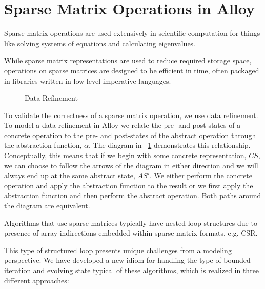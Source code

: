 \section{Sparse Matrix Operations in Alloy}
\label{sec:ops}

Sparse matrix operations are used extensively in scientific computation for things like solving systems of equations and calculating eigenvalues. 

While sparse matrix representations are used to reduce required storage space, operations on sparse matrices are designed to be efficient in time, often packaged in libraries written in low-level imperative languages.

\begin{figure}
\begin{center}
\end{center}
\caption{Data Refinement}
\label{fig:procref}
\end{figure}

To validate the correctness of a sparse matrix operation, we use data refinement.  To model a data refinement in Alloy we relate the pre- and post-states of a concrete operation to the pre- and post-states of the abstract operation through the abstraction function, $\alpha$.  The diagram in \figurename~\ref{fig:procref} demonstrates this relationship.  Conceptually, this means that if we begin with some concrete representation, $CS$, we can choose to follow the arrows of the diagram in either direction and we will always end up at the same abstract state, $AS'$.  We either perform the concrete operation and apply the abstraction function to the result or we first apply the abstraction function and then perform the abstract operation.  Both paths around the diagram are equivalent.

Algorithms that use sparse matrices typically have nested loop structures due to presence of array indirections embedded within sparse matrix formats, e.g. CSR.

This type of structured loop presents unique challenges from a modeling perspective.  We have developed a new idiom for handling the type of bounded iteration and evolving state typical of these algorithms, which is realized in three different approaches:

